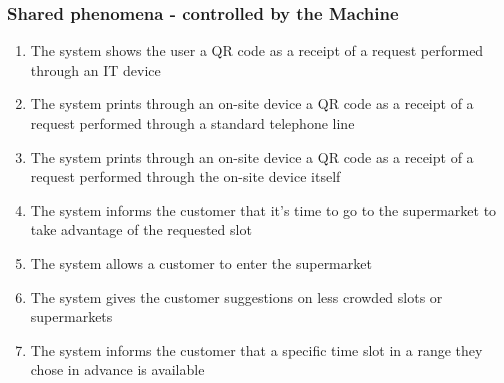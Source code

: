 \documentclass[../../main.tex]{subfiles}
\begin{document}
\subsubsection{Shared phenomena - controlled by the Machine}

\begin{enumerate}
  \item The system shows the user a QR code as a receipt of a request performed
  through an IT device
  \item The system prints through an on-site device a QR code as a receipt of a
  request performed through a standard telephone line
  \item The system prints through an on-site device a QR code as a receipt of a
  request performed through the on-site device itself
  \item The system informs the customer that it's time to go to the supermarket
  to take advantage of the requested slot
  \item The system allows a customer to enter the supermarket
  \item The system gives the customer suggestions on less crowded slots or
  supermarkets
  \item The system informs the customer that a specific time slot in a range
  they chose in advance is available
\end{enumerate}
\end{document}
